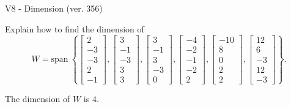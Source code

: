 \begin{exercise}
  \begin{exerciseTitle}V8 - Dimension (ver. 356)\end{exerciseTitle}
  \begin{exerciseStatement}
    Explain how to find the dimension of 
\[W=\mathrm{span}\ \left\{\left[\begin{array}{r}
2 \\
-3 \\
-3 \\
2 \\
-1
\end{array}\right] , \left[\begin{array}{r}
3 \\
-1 \\
-3 \\
3 \\
3
\end{array}\right] , \left[\begin{array}{r}
3 \\
-1 \\
3 \\
-3 \\
0
\end{array}\right] , \left[\begin{array}{r}
-4 \\
-2 \\
-1 \\
-2 \\
2
\end{array}\right] , \left[\begin{array}{r}
-10 \\
8 \\
0 \\
2 \\
2
\end{array}\right] , \left[\begin{array}{r}
12 \\
6 \\
-3 \\
12 \\
-3
\end{array}\right]\right\}.\]



  \end{exerciseStatement}
  \begin{exerciseAnswer}
   The dimension of \(W\) is  \(4\).
  


  \end{exerciseAnswer}
\end{exercise}